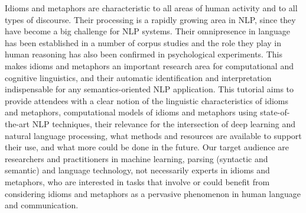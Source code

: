 Idioms and metaphors are characteristic to all areas of human activity and to all types of discourse. Their processing is a rapidly growing area in NLP, since they have become a big challenge for NLP systems. Their omnipresence in language has been established in a number of corpus studies and the role they play in human reasoning has also been confirmed in psychological experiments. This makes idioms and metaphors an important research area for computational and cognitive linguistics, and their automatic identification and interpretation indispensable for any semantics-oriented NLP application. This tutorial aims to provide attendees with a clear notion of the linguistic characteristics of idioms and metaphors, computational models of idioms and metaphors using state-of-the-art NLP techniques, their relevance for the intersection of deep learning and natural language processing, what methods and resources are available to support their use, and what more could be done in the future. Our target audience are researchers and practitioners in machine learning, parsing (syntactic and semantic) and language technology, not necessarily experts in idioms and metaphors, who are interested in tasks that involve or could benefit from considering idioms and metaphors as a pervasive phenomenon in human language and communication.
